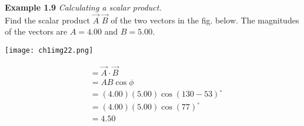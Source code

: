 \begin{examplebox}
\textbf{Example 1.9} \textit{Calculating a scalar product.}\\

Find the scalar product $\overrightarrow{A}$ \cdot $\overrightarrow{B}$ of the two vectors in the fig. below. The magnitudes of the vectors are $A = 4.00$ and $B = 5.00$.

\begin{center}
\texttt{[image: ch1img22.png]}
\end{center}
\begin{mathbox}
\begin{align*}
&= \overrightarrow{A} \cdot \overrightarrow{B}\\ 
&= A B \cos \phi\\
&= \left(4.00\right)\left(5.00\right) \cos\left(130 - 53\right)^\circ\\
&= \left(4.00\right)\left(5.00\right) \cos\left(77\right)^\circ\\
&= 4.50
\end{align*}
\end{mathbox}
\end{examplebox} 


